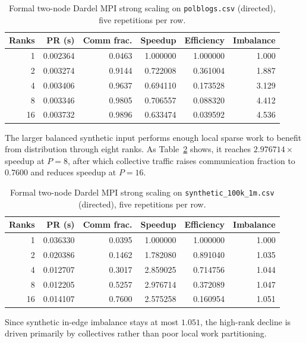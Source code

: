 \documentclass[11pt]{article}
\begin{document}
\begin{table}[H]
\centering
\caption{Formal two-node Dardel MPI strong scaling on
\texttt{polblogs.csv} (directed), five repetitions per row.}
\label{tab:mpi-dardel-polblogs}
\small
\begin{tabular}{rrrrrr}
\toprule
Ranks & PR (s) & Comm frac. & Speedup & Efficiency & Imbalance \\
\midrule
1  & 0.002364 & 0.0463 & 1.000000 & 1.000000 & 1.000 \\
2  & 0.003274 & 0.9144 & 0.722008 & 0.361004 & 1.887 \\
4  & 0.003406 & 0.9637 & 0.694110 & 0.173528 & 3.129 \\
8  & 0.003346 & 0.9805 & 0.706557 & 0.088320 & 4.412 \\
16 & 0.003732 & 0.9896 & 0.633474 & 0.039592 & 4.536 \\
\bottomrule
\end{tabular}
\end{table}

The larger balanced synthetic input performs enough local sparse work to
benefit from distribution through eight ranks. As
Table~\ref{tab:mpi-dardel-synth} shows, it reaches $2.976714\times$
speedup at $P=8$, after which collective traffic raises communication
fraction to $0.7600$ and reduces speedup at $P=16$.

\begin{table}[H]
\centering
\caption{Formal two-node Dardel MPI strong scaling on
\texttt{synthetic\_100k\_1m.csv} (directed), five repetitions per row.}
\label{tab:mpi-dardel-synth}
\small
\begin{tabular}{rrrrrr}
\toprule
Ranks & PR (s) & Comm frac. & Speedup & Efficiency & Imbalance \\
\midrule
1  & 0.036330 & 0.0395 & 1.000000 & 1.000000 & 1.000 \\
2  & 0.020386 & 0.1462 & 1.782080 & 0.891040 & 1.035 \\
4  & 0.012707 & 0.3017 & 2.859025 & 0.714756 & 1.044 \\
8  & 0.012205 & 0.5257 & 2.976714 & 0.372089 & 1.047 \\
16 & 0.014107 & 0.7600 & 2.575258 & 0.160954 & 1.051 \\
\bottomrule
\end{tabular}
\end{table}

Since synthetic in-edge imbalance stays at most $1.051$, the high-rank
decline is driven primarily by collectives rather than poor local work
partitioning.
\end{document}
